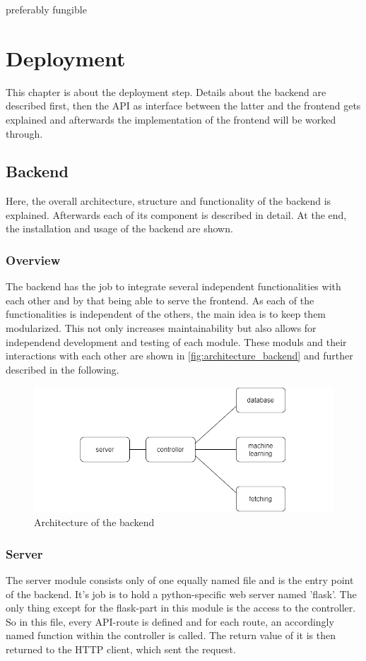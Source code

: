 
preferably fungible

\chapter{Deployment}
This chapter is about the deployment step. Details about the backend are described first, then the API as interface between the latter and the frontend gets explained and afterwards the implementation of the frontend will be worked through.

\section{Backend}
Here, the overall architecture, structure and functionality of the backend is explained. Afterwards each of its component is described in detail. At the end, the installation and usage of the backend are shown.

\subsection{Overview}
The backend has the job to integrate several independent functionalities with each other and by that being able to serve the frontend.
As each of the functionalities is independent of the others, the main idea is to keep them modularized. This not only increases maintainability but also allows for independend development and testing of each module. These moduls and their interactions with each other are shown in \autoref{fig:architecture_backend} and further described in the following.
\begin{figure}[H]
\centering
\includegraphics[width=1\textwidth]{images/modules.png}
\caption{Architecture of the backend}
\label{fig:architecture_backend}
\end{figure}

\subsection{Server}
The server module consists only of one equally named file and is the entry point of the backend. It's job is to hold a python-specific web server named 'flask'. The only thing except for the flask-part in this module is the access to the controller.
\newline
So in this file, every API-route is defined and for each route, an accordingly named function within the controller is called. The return value of it is then returned to the HTTP client, which sent the request.

